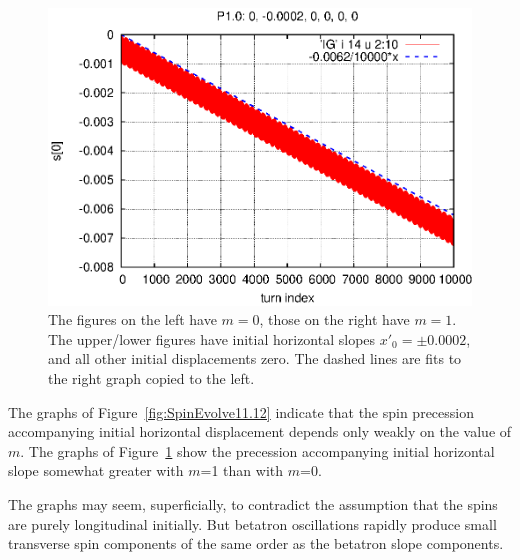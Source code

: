 \documentclass[]{article}
\begin{document}
\begin{figure}[h]
\includegraphics[scale=0.6]{eps/SpinEvolve14.P1.0.eps}
\caption{\label{fig:SpinEvolve13.14}The figures on the left have 
$m=0$, those on the right have $m=1$. The upper/lower figures
have initial horizontal slopes $x'_0=\pm0.0002$, and all other
initial displacements zero. The dashed lines are fits to
the right graph copied to the left. 
}
\end{figure}
%
The graphs of Figure~\ref{fig:SpinEvolve11.12} indicate  
that the spin precession accompanying initial horizontal
displacement depends only weakly on the value of $m$.
The graphs of Figure~\ref{fig:SpinEvolve13.14} 
show the precession accompanying initial horizontal
slope somewhat greater with $m$=1 than with $m$=0.

The graphs may
seem, superficially, to contradict the assumption that the
spins are purely longitudinal initially. But betatron oscillations
rapidly produce small transverse spin components of the same order
as the betatron slope components.

\clearpage
\end{document}
